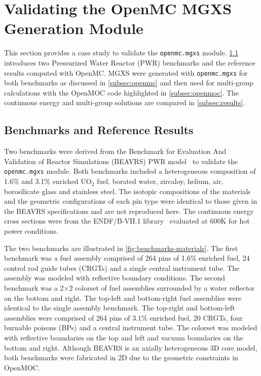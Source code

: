 \section{Validating the OpenMC MGXS Generation Module}
\label{sec:validate}

This section provides a case study to validate the \texttt{openmc.mgxs} module. \cref{subsec:benchmarks} introduces two Pressurized Water Reactor (PWR) benchmarks and the reference results computed with OpenMC. MGXS were generated with \texttt{openmc.mgxs} for both benchmarks as discussed in \cref{subsec:openmc} and then used for multi-group calculations with the OpenMOC code highlighted in \cref{subsec:openmoc}. The continuous energy and multi-group solutions are compared in \cref{subsec:results}.


\subsection{Benchmarks and Reference Results}
\label{subsec:benchmarks}

Two benchmarks were derived from the Benchmark for Evaluation And Validation of Reactor Simulations (BEAVRS) PWR model~\cite{horelik2013beavrs} to validate the \texttt{openmc.mgxs} module. Both benchmarks included a heterogeneous composition of 1.6\% and 3.1\% enriched UO$_2$ fuel, borated water, zircaloy, helium, air, borosilicate glass and stainless steel. The isotopic compositions of the materials and the geometric configurations of each pin type were identical to those given in the BEAVRS specifications and are not reproduced here. The continuous energy cross sections were from the ENDF/B-VII.1 library~\cite{mcnpx2003manual} evaluated at 600K for hot power conditions.

The two benchmarks are illustrated in \cref{fig:benchmarks-materials}. The first benchmark was a fuel assembly comprised of 264 pins of 1.6\% enriched fuel, 24 control rod guide tubes (CRGTs) and a single central instrument tube. The assembly was modeled with reflective boundary conditions. The second benchmark was a 2$\times$2 colorset of fuel assemblies surrounded by a water reflector on the bottom and right. The top-left and bottom-right fuel assemblies were identical to the single assembly benchmark. The top-right and bottom-left assemblies were comprised of 264 pins of 3.1\% enriched fuel, 20 CRGTs, four burnable poisons (BPs) and a central instrument tube. The colorset was modeled with reflective boundaries on the top and left and vacuum boundaries on the bottom and right. Although BEAVRS is an axially heterogeneous 3D core model, both benchmarks were fabricated in 2D due to the geometric constraints in OpenMOC.

